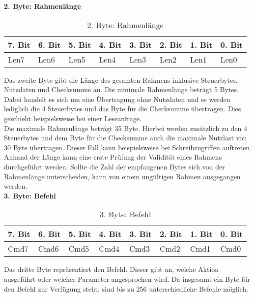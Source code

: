 \textbf{2. Byte: Rahmenlänge}

\begin{table}[H]
\begin{center}
\begin{tabularx}{\textwidth}{|X|X|X|X|X|X|X|X|}\hline
 7. Bit & 6. Bit & 5. Bit & 4. Bit & 3. Bit & 2. Bit & 1. Bit & 0. Bit\\ \hline
 Len7 & Len6 & Len5 & Len4 & Len3 & Len2 & Len1 & Len0\\ \hline
\end{tabularx}
\caption{2. Byte: Rahmenlänge}
\label{table_2Byte}
\end{center}
\end{table}

Das zweite Byte gibt die Länge des gesamten Rahmens inklusive Steuerbytes, Nutzdaten und Checksumme an. Die minimale Rahmenlänge beträgt 5 Bytes. Dabei handelt es sich um eine Übertragung ohne Nutzdaten und es werden lediglich die 4 Steuerbytes und das Byte für die Checksumme übertragen. Dies geschieht beispielsweise bei einer Leseanfrage.\\
Die maximale Rahmenlänge beträgt 35 Byte. Hierbei werden zusätzlich zu den 4 Steuerbytes und dem Byte für die Checksumme auch die maximale Nutzlast von 30 Byte übertragen. Dieser Fall kann beispielsweise bei Schreibzugriffen auftreten.\\
Anhand der Länge kann eine erste Prüfung der Validität eines Rahmens durchgeführt werden. Sollte die Zahl der empfangenen Bytes sich von der Rahmenlänge unterscheiden, kann von einem ungültigen Rahmen ausgegangen werden.\\



\textbf{3. Byte: Befehl}

\begin{table}[H]
\begin{center}
\begin{tabularx}{\textwidth}{|X|X|X|X|X|X|X|X|}\hline
 7. Bit & 6. Bit & 5. Bit & 4. Bit & 3. Bit & 2. Bit & 1. Bit & 0. Bit\\ \hline
 Cmd7 & Cmd6 & Cmd5 & Cmd4 & Cmd3 & Cmd2 & Cmd1 & Cmd0\\ \hline
\end{tabularx}
\caption{3. Byte: Befehl}
\label{table_3Byte}
\end{center}
\end{table}

Das dritte Byte repräsentiert den Befehl. Dieser gibt an, welche Aktion ausgeführt oder welcher Parameter angesprochen wird. Da insgesamt ein Byte für den Befehl zur Verfügung steht, sind bis zu 256 unterschiedliche Befehle möglich.\\


